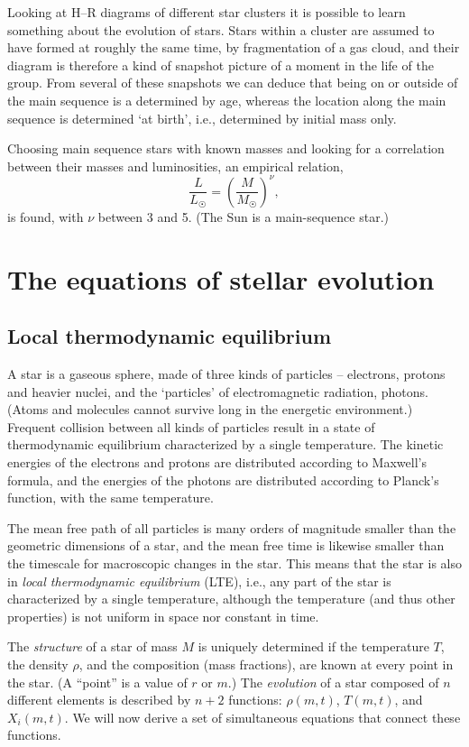 \documentclass[]{article}
\newcommand{\Sun}{\astrosun}
\begin{document}
Looking at H--R diagrams of different star clusters it is possible to learn
something about the evolution of stars. Stars within a cluster are assumed to
have formed at roughly the same time, by fragmentation of a gas cloud, and their
diagram is therefore a kind of snapshot picture of a moment in the life of the
group. From several of these snapshots we can deduce that being on or outside
of the main sequence is a determined by age, whereas the location along the main
sequence is determined `at birth', i.e., determined by initial mass only.

Choosing main sequence stars with known masses and looking for a correlation
between their masses and luminosities, an empirical relation,
\begin{equation}
\frac{L}{L_{\Sun}}=\left(\frac{M}{M_{\Sun}}\right)^\nu,
\end{equation}
is found, with $\nu$ between 3 and 5. (The Sun is a main-sequence star.)

\section{The equations of stellar evolution}

\subsection{Local thermodynamic equilibrium}
A star is a gaseous sphere, made of three kinds of particles -- electrons,
protons and heavier nuclei, and the `particles' of electromagnetic radiation,
photons. (Atoms and molecules cannot survive long in the energetic environment.)
Frequent collision between all kinds of particles result in a state of
thermodynamic equilibrium characterized by a single temperature. The kinetic
energies of the electrons and protons are distributed according to Maxwell's
formula, and the energies of the photons are distributed according to Planck's
function, with the same temperature.

The mean free path of all particles is many orders of magnitude smaller than the
geometric dimensions of a star, and the mean free time is likewise smaller than
the timescale for macroscopic changes in the star. This means that the star is
also in \emph{local thermodynamic equilibrium} (LTE), i.e., any part of the star
is characterized by a single temperature, although the temperature (and thus
other properties) is not uniform in space nor constant in time.

The \emph{structure} of a star of mass $M$ is uniquely determined if the
temperature $T$, the density $\rho$, and the composition (mass fractions), are
known at every point in the star. (A ``point'' is a value of $r$ or $m$.) The
\emph{evolution} of a star composed of $n$ different elements is described by
$n+2$ functions: $\rho(m,t)$, $T(m,t)$, and $X_i(m,t)$. We will now derive a
set of simultaneous equations that connect these functions.
\end{document}
